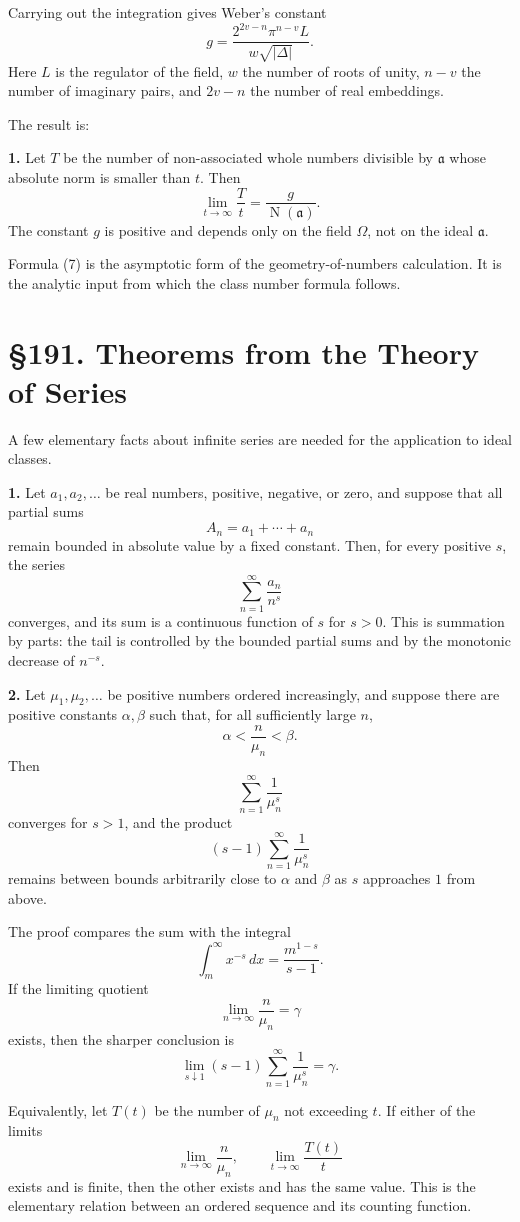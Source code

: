 \documentclass[12pt,a4paper]{article}
\newcommand{\webersection}[2]{\clearpage\section*{\S #1. #2}}
\newcommand{\ideala}{\mathfrak a}
\newcommand{\N}{\operatorname{N}}
\begin{document}
Carrying out the integration gives Weber's constant
\[
  g=\frac{2^{2v-n}\pi^{n-v}L}{w\sqrt{|\Delta|}}.
\tag{6}
\]
Here \(L\) is the regulator of the field, \(w\) the number of roots of unity, \(n-v\) the number of imaginary pairs, and \(2v-n\) the number of real embeddings.

The result is:

\textbf{1.} Let \(T\) be the number of non-associated whole numbers divisible by \(\ideala\) whose absolute norm is smaller than \(t\).  Then
\[
  \lim_{t\to\infty}\frac{T}{t}
  =\frac{g}{\N(\ideala)}.
\tag{7}
\]
The constant \(g\) is positive and depends only on the field \(\Omega\), not on the ideal \(\ideala\).

Formula (7) is the asymptotic form of the geometry-of-numbers calculation.  It is the analytic input from which the class number formula follows.

\webersection{191}{Theorems from the Theory of Series}

A few elementary facts about infinite series are needed for the application to ideal classes.

\textbf{1.} Let \(a_1,a_2,
\ldots\) be real numbers, positive, negative, or zero, and suppose that all partial sums
\[
  A_n=a_1+
\cdots+a_n
\]
remain bounded in absolute value by a fixed constant.  Then, for every positive \(s\), the series
\[
  \sum_{n=1}^\infty \frac{a_n}{n^s}
\tag{1}
\]
converges, and its sum is a continuous function of \(s\) for \(s>0\).  This is summation by parts: the tail is controlled by the bounded partial sums and by the monotonic decrease of \(n^{-s}\).

\textbf{2.} Let \(\mu_1,\mu_2,
\ldots\) be positive numbers ordered increasingly, and suppose there are positive constants \(\alpha,\beta\) such that, for all sufficiently large \(n\),
\[
  \alpha<\frac{n}{\mu_n}<\beta.
\tag{2}
\]
Then
\[
  \sum_{n=1}^{\infty}\frac1{\mu_n^s}
\tag{3}
\]
converges for \(s>1\), and the product
\[
  (s-1)
  \sum_{n=1}^{\infty}\frac1{\mu_n^s}
\tag{4}
\]
remains between bounds arbitrarily close to \(\alpha\) and \(\beta\) as \(s\) approaches \(1\) from above.

The proof compares the sum with the integral
\[
  \int_m^\infty x^{-s}\,dx=\frac{m^{1-s}}{s-1}.
\]
If the limiting quotient
\[
  \lim_{n\to\infty}\frac{n}{\mu_n}=\gamma
\tag{5}
\]
exists, then the sharper conclusion is
\[
  \lim_{s\downarrow1}(s-1)
  \sum_{n=1}^{\infty}\frac1{\mu_n^s}=\gamma.
\tag{6}
\]

Equivalently, let \(T(t)\) be the number of \(\mu_n\) not exceeding \(t\).  If either of the limits
\[
  \lim_{n\to\infty}\frac{n}{\mu_n},
  \qquad
  \lim_{t\to\infty}\frac{T(t)}{t}
\tag{7}
\]
exists and is finite, then the other exists and has the same value.  This is the elementary relation between an ordered sequence and its counting function.
\end{document}

